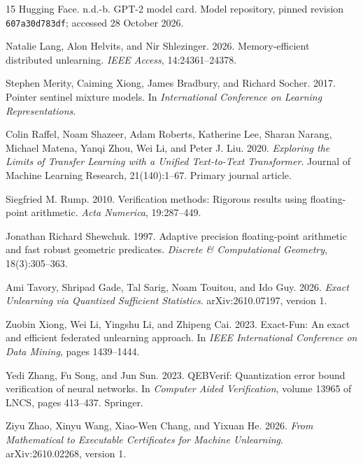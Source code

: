 \documentclass[11pt,a4paper]{article}
\def\href#1#2{{#2}}
\begin{document}
\begin{thebibliography}{15}
Hugging Face. n.d.-b.
\href{https://huggingface.co/openai-community/gpt2/blob/607a30d783dfa663caf39e06633721c8d4cfcd7e/README.md}{GPT-2 model card}.
Model repository, pinned revision \nolinkurl{607a30d783df}; accessed 28 October 2026.

Natalie Lang, Alon Helvits, and Nir Shlezinger. 2026.
\href{https://doi.org/10.1109/ACCESS.2026.3663428}{Memory-efficient distributed unlearning}.
\emph{IEEE Access}, 14:24361--24378.

Stephen Merity, Caiming Xiong, James Bradbury, and Richard Socher. 2017.
\href{https://openreview.net/pdf?id=Byj72udxe}{Pointer sentinel mixture models}.
In \emph{International Conference on Learning Representations}.

Colin Raffel, Noam Shazeer, Adam Roberts, Katherine Lee, Sharan Narang,
Michael Matena, Yanqi Zhou, Wei Li, and Peter J. Liu.
2020. \emph{Exploring the Limits of Transfer Learning with a Unified Text-to-Text
Transformer}. Journal of Machine Learning Research, 21(140):1--67.
\href{https://jmlr.org/papers/v21/20-074.html}{Primary journal article}.

Siegfried M. Rump. 2010.
\href{https://www.tuhh.de/ti3/rump/intlab/ActaNumerica2010.pdf}{Verification methods: Rigorous results using floating-point arithmetic}.
\emph{Acta Numerica}, 19:287--449.

Jonathan Richard Shewchuk. 1997.
\href{https://people.eecs.berkeley.edu/~jrs/papers/robustr.pdf}{Adaptive precision floating-point arithmetic and fast robust geometric predicates}.
\emph{Discrete \& Computational Geometry}, 18(3):305--363.

Ami Tavory, Shripad Gade, Tal Sarig, Noam Touitou, and Ido Guy.
2026. \emph{Exact Unlearning via Quantized Sufficient Statistics}.
\href{https://arxiv.org/html/2610.07197v1}{arXiv:2610.07197, version 1}.

Zuobin Xiong, Wei Li, Yingshu Li, and Zhipeng Cai. 2023.
\href{https://doi.org/10.1109/ICDM58522.2023.00188}{Exact-Fun: An exact and efficient federated unlearning approach}.
In \emph{IEEE International Conference on Data Mining}, pages 1439--1444.

Yedi Zhang, Fu Song, and Jun Sun. 2023.
\href{https://doi.org/10.1007/978-3-031-37703-7_20}{QEBVerif: Quantization error bound verification of neural networks}.
In \emph{Computer Aided Verification}, volume 13965 of LNCS, pages 413--437. Springer.

Ziyu Zhao, Xinyu Wang, Xiao-Wen Chang, and Yixuan He.
2026. \emph{From Mathematical to Executable Certificates for Machine Unlearning}.
\href{https://arxiv.org/html/2610.02268v1}{arXiv:2610.02268, version 1}.
\end{thebibliography}
\end{document}
